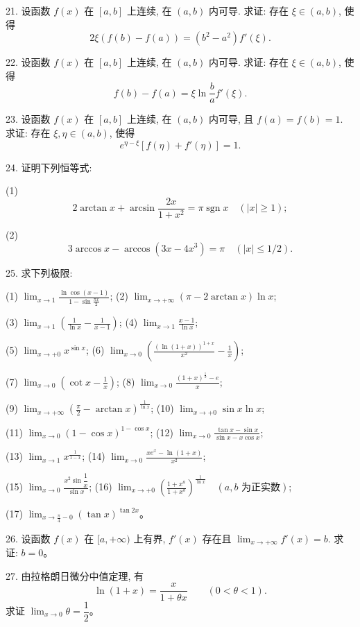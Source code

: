 \documentclass[UTF8, 12pt, fontset=fandol, oneside]{ctexart}
\begin{document}
21. 设函数 $f(x)$ 在 $[a,b]$ 上连续, 在 $(a,b)$ 内可导. 求证: 存在 $\xi\in(a,b)$, 使得
\[
  2\xi(f(b)-f(a))=(b^2-a^2)f'(\xi).
\]

22. 设函数 $f(x)$ 在 $[a,b]$ 上连续, 在 $(a,b)$ 内可导. 求证: 存在 $\xi\in(a,b)$, 使得
\[
  f(b)-f(a)=\xi\ln\frac ba f'(\xi).
\]

23. 设函数 $f(x)$ 在 $[a,b]$ 上连续, 在 $(a,b)$ 内可导, 且 $f(a)=f(b)=1$. 求证: 存在 $\xi,\eta\in(a,b)$, 使得
\[
  e^{\eta-\xi}[f(\eta)+f'(\eta)]=1.
\]

24. 证明下列恒等式:

(1)
\[
  2\arctan x+\arcsin\frac{2x}{1+x^2}=\pi\operatorname{sgn}x\quad (|x|\geqslant1);
\]

(2)
\[
  3\arccos x-\arccos(3x-4x^3)=\pi\quad (|x|\leqslant1/2).
\]

25. 求下列极限:

(1) $\displaystyle\lim_{x\to1}\frac{\ln\cos(x-1)}{1-\sin\frac{\pi x}2}$;\qquad
(2) $\displaystyle\lim_{x\to+\infty}(\pi-2\arctan x)\ln x$;

(3) $\displaystyle\lim_{x\to1}\left(\frac1{\ln x}-\frac1{x-1}\right)$;\qquad
(4) $\displaystyle\lim_{x\to1}\frac{x-1}{\ln x}$;

(5) $\displaystyle\lim_{x\to+0}x^{\sin x}$;\qquad
(6) $\displaystyle\lim_{x\to0}\left(\frac{(\ln(1+x))^{1+x}}{x^2}-\frac1x\right)$;

(7) $\displaystyle\lim_{x\to0}\left(\cot x-\frac1x\right)$;\qquad
(8) $\displaystyle\lim_{x\to0}\frac{(1+x)^{\frac1x}-e}{x}$;

(9) $\displaystyle\lim_{x\to+\infty}\left(\frac\pi2-\arctan x\right)^{\frac1{\ln x}}$;\qquad
(10) $\displaystyle\lim_{x\to+0}\sin x\ln x$;

(11) $\displaystyle\lim_{x\to0}(1-\cos x)^{1-\cos x}$;\qquad
(12) $\displaystyle\lim_{x\to0}\frac{\tan x-\sin x}{\sin x-x\cos x}$;

(13) $\displaystyle\lim_{x\to1}x^{\frac1{1-x}}$;\qquad
(14) $\displaystyle\lim_{x\to0}\frac{xe^x-\ln(1+x)}{x^2}$;

(15) $\displaystyle\lim_{x\to0}\frac{x^2\sin\dfrac1x}{\sin x}$;\qquad
(16) $\displaystyle\lim_{x\to+0}\left(\frac{1+x^a}{1+x^b}\right)^{\frac1{\ln x}}\quad (a,b\text{ 为正实数})$;

(17) $\displaystyle\lim_{x\to\frac\pi4-0}(\tan x)^{\tan 2x}$。

26. 设函数 $f(x)$ 在 $[a,+\infty)$ 上有界, $f'(x)$ 存在且 $\lim_{x\to+\infty}f'(x)=b$. 求证: $b=0$。

27. 由拉格朗日微分中值定理, 有
\[
  \ln(1+x)=\frac{x}{1+\theta x}\qquad (0<\theta<1).
\]
求证 $\lim_{x\to0}\theta=\dfrac12$。
\end{document}
